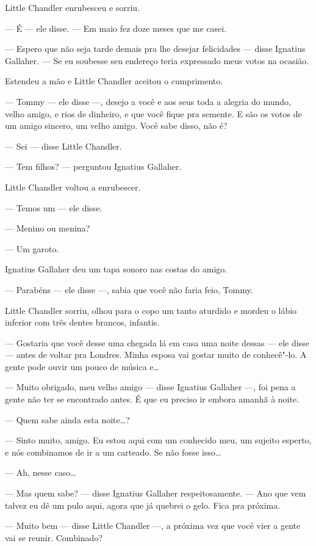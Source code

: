 Little Chandler enrubesceu e sorriu.

--- É --- ele disse.  --- Em maio fez doze meses que me casei.

--- Espero que não seja tarde demais pra lhe desejar felicidades --- disse
Ignatius Gallaher.  --- Se eu soubesse seu endereço teria expressado meus votos
na ocasião.

Estendeu a mão e Little Chandler aceitou o cumprimento.

--- Tommy --- ele disse ---, desejo a você e aos seus toda a alegria do mundo,
velho amigo, e rios de dinheiro, e que você fique pra semente.  E são os votos
de um amigo sincero, um velho amigo.  Você sabe disso, não é?

--- Sei --- disse Little Chandler.

--- Tem filhos? --- perguntou Ignatius Gallaher.

Little Chandler voltou a enrubescer.

--- Temos um --- ele disse.

--- Menino ou menina?

--- Um garoto.

Ignatius Gallaher deu um tapa sonoro nas costas do amigo.

--- Parabéns --- ele disse ---, sabia que você não faria feio, Tommy.

Little Chandler sorriu, olhou para o copo um tanto aturdido e mordeu o lábio
inferior com três dentes brancos, infantis.

--- Gostaria que você desse uma chegada lá em casa uma noite dessas --- ele
disse --- antes de voltar pra Londres.  Minha esposa vai gostar muito de
conhecê"-lo.  A gente pode ouvir um pouco de música e\ldots{}

--- Muito obrigado, meu velho amigo --- disse Ignatius Gallaher ---, foi pena a
gente não ter se encontrado antes.  É que eu preciso ir embora amanhã à noite.

--- Quem sabe ainda esta noite\ldots{}?

--- Sinto muito, amigo.  Eu estou aqui com um conhecido meu, um sujeito
esperto, e nós combinamos de ir a um carteado.  Se não fosse isso\ldots{}

--- Ah, nesse caso\ldots{}

--- Mas quem sabe? --- disse Ignatius Gallaher respeitosamente.  --- Ano que
vem talvez eu dê um pulo aqui, agora que já quebrei o gelo.  Fica pra próxima.

--- Muito bem --- disse Little Chandler ---, a próxima vez que você vier a
gente vai se reunir.  Combinado?

